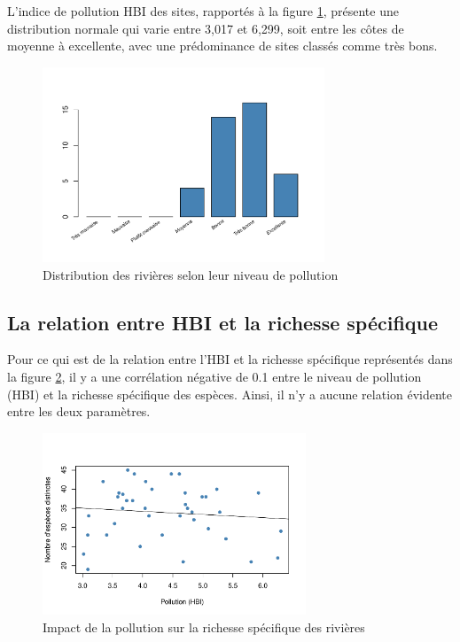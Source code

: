 \documentclass[cm,linguex]{glossa}
\begin{document}
L'indice de pollution HBI des sites, rapportés à la figure
\protect\hyperlink{fig:fig-1}{1}, présente une distribution normale qui
varie entre 3,017 et 6,299, soit entre les côtes de moyenne à
excellente, avec une prédominance de sites classés comme très bons.

\begin{figure}[H]

{\centering \includegraphics[width=0.75\textwidth]{rapport-finale_files/figure-latex/fig-1-1} 

}

\caption{Distribution des rivières selon leur niveau de pollution}\label{fig:fig-1}
\end{figure}

\hypertarget{la-relation-entre-hbi-et-la-richesse-spuxe9cifique}{%
\subsection{La relation entre HBI et la richesse
spécifique}\label{la-relation-entre-hbi-et-la-richesse-spuxe9cifique}}

Pour ce qui est de la relation entre l'HBI et la richesse spécifique
représentés dans la figure \protect\hyperlink{fig:fig-2}{2}, il y a une
corrélation négative de 0.1 entre le niveau de pollution (HBI) et la
richesse spécifique des espèces. Ainsi, il n'y a aucune relation
évidente entre les deux paramètres.

\begin{figure}[H]

{\centering \includegraphics[width=0.7\textwidth]{rapport-finale_files/figure-latex/fig-2-1} 

}

\caption{Impact de la pollution sur la richesse spécifique des rivières}\label{fig:fig-2}
\end{figure}
\end{document}
